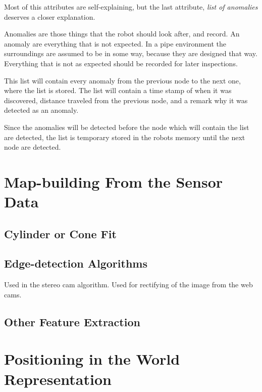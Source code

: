 Most of this attributes are self-explaining, but the last attribute, \emph{list of
anomalies} deserves a closer explanation. 

Anomalies are those things that the robot should look after, and record. An anomaly are
everything that is not expected. In a pipe environment the surroundings are assumed to be
in some way, because they are designed that way. Everything that is not as expected should
be recorded for later inspections. 

This list will contain every anomaly from the previous node to the next one, where the
list is stored. The list will contain a time stamp of when it was discovered, distance
traveled from the previous node, and a remark why it was detected as an anomaly. 

Since the anomalies will be detected before the node which will contain the list are
detected, the list is temporary stored in the robots memory until the next node are
detected. 


\section{Map-building From the Sensor Data}


\subsection{Cylinder or Cone Fit}



\subsection{Edge-detection Algorithms}
Used in the stereo cam algorithm. Used for rectifying of the image from the web cams. 


\subsection{Other Feature Extraction}


\section{Positioning in the World Representation}




